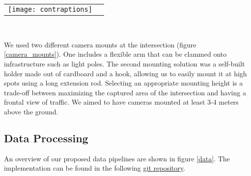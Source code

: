 \ \\





\ \\ 
\raggedbottom
\begin{tabular}{@{}cc}
\texttt{[image: contraptions]}
\end{tabular}
\label{camera_mounts}
\

We used two different camera mounts at the intersection (figure \ref{camera_mounts}). One includes a flexible arm that can be clammed onto infrastructure such as light poles.
The second mounting solution was a self-built holder made out of cardboard and a hook, allowing us to easily mount it at high spots using a long extension rod.
Selecting an appropriate mounting height is a trade-off between maximizing the captured area of the intersection and having a frontal view of traffic.
We aimed to have cameras mounted at least 3-4 meters above the ground.

\subsection{Data Processing}
An overview of our proposed data pipelines are shown in figure \ref{data}. 
The implementation can be found in the following \href{https://github.com/edibegovic/cyclist-behaviourCPH-2021}{git repository}.
\ \\

